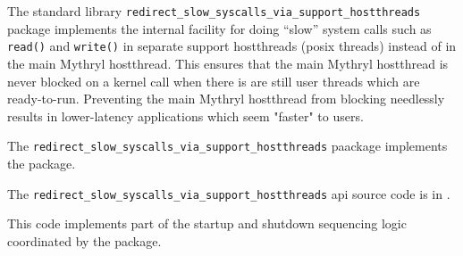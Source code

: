 

The standard library {\tt redirect\_slow\_syscalls\_via\_support\_hostthreads} package implements the internal facility 
for doing ``slow'' system calls such as {\tt read()} and {\tt write()} in separate support hostthreads (posix threads) 
instead of in the main Mythryl hostthread.  This ensures that the main Mythryl hostthread is never blocked on a kernel 
call when there is are still user threads which are ready-to-run.  Preventing the main Mythryl hostthread from blocking 
needlessly results in lower-latency applications which seem "faster" to users. 

The {\tt redirect\_slow\_syscalls\_via\_support\_hostthreads} paackage implements the 
 package. 

The {\tt redirect\_slow\_syscalls\_via\_support\_hostthreads} api source code is in 
. 

This code implements part of the startup and shutdown sequencing logic coordinated by the 
 package. 

